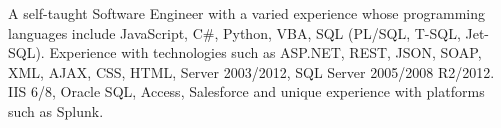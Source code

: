 


\begin{cvparagraph}
A self-taught Software Engineer with a varied experience whose programming languages include JavaScript, C\#, Python, VBA, SQL (PL/SQL, T-SQL, Jet-SQL).  Experience with technologies such as ASP.NET, REST, JSON, SOAP, XML, AJAX, CSS, HTML, Server 2003/2012, SQL Server 2005/2008 R2/2012. IIS 6/8, Oracle SQL, Access, Salesforce and unique experience with platforms such as Splunk.
\end{cvparagraph}

